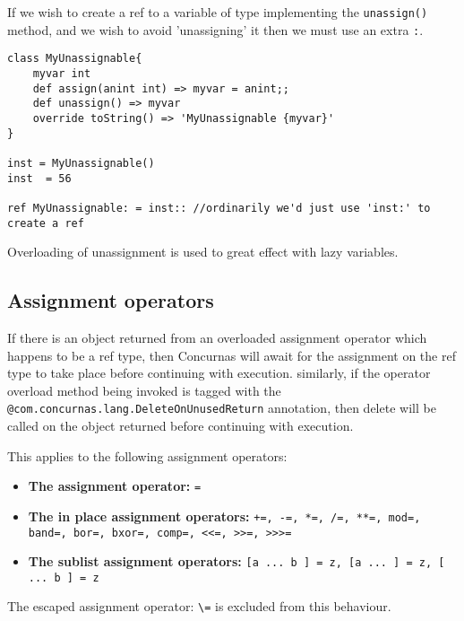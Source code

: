 \documentclass[conc-doc]{subfiles}
\begin{document}
If we wish to create a ref to a variable of type implementing the \lstinline{unassign()} method, and we wish to avoid 'unassigning' it then we must use an extra \lstinline{:}.

\begin{lstlisting}
class MyUnassignable{
	myvar int
	def assign(anint int) => myvar = anint;;
	def unassign() => myvar
	override toString() => 'MyUnassignable {myvar}'
}

inst = MyUnassignable()
inst  = 56

ref MyUnassignable: = inst:: //ordinarily we'd just use 'inst:' to create a ref
\end{lstlisting}

Overloading of unassignment is used to great effect with lazy variables.

\subsection{Assignment operators}
If there is an object returned from an overloaded assignment operator which happens to be a ref type, then Concurnas will await for the assignment on the ref type to take place before continuing with execution. similarly, if the operator overload method being invoked is tagged with the \lstinline{@com.concurnas.lang.DeleteOnUnusedReturn} annotation, then delete will be called on the object returned before continuing with execution.

This applies to the following assignment operators: 
\begin{itemize}
	\item \textbf{The assignment operator:} \lstinline{=}
	\item \textbf{The in place assignment operators:} \lstinline{+=, -=, *=, /=, **=, mod=, band=, bor=, bxor=, comp=, <<=, >>=, >>>=}
	\item \textbf{The sublist assignment operators:} \lstinline{[a ... b ] = z, [a ... ] = z, [ ... b ] = z}
\end{itemize}

The escaped assignment operator: \lstinline{\=} is excluded from this behaviour.
\end{document}
